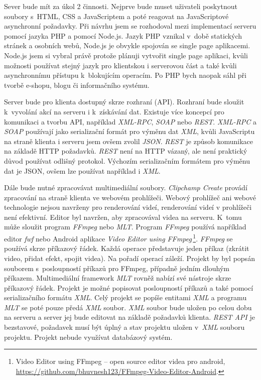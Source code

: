 Sever bude mít za úkol 2 činnosti. Nejprve bude muset uživateli poskytnout soubory s~HTML, CSS a JavaScriptem a poté reagovat na JavaScriptové asynchronní požadavky. Při návrhu jsem se rozhodoval mezi implementací serveru pomocí jazyka PHP a pomocí Node.js. Jazyk PHP vznikal v~době statických stránek a osobních webů, Node.js je obvykle spojován se single page aplikacemi. Node.js jsem si vybral právě protože plánuji vytvořit single page aplikaci, kvůli možnosti používat stejný jazyk pro klientskou i serverovou část a také kvůli asynchronnímu přístupu k~blokujícím operacím. Po PHP bych naopak sáhl při tvorbě e-shopu, blogu či informačního systému.

Server bude pro klienta dostupný skrze rozhraní (API). Rozhraní bude sloužit k~vyvolání akcí na serveru i k~získávání dat. Existuje více koncepcí pro komunikaci a tvorbu API, například \textit{XML-RPC}, \textit{SOAP} nebo \textit{REST}. \textit{XML-RPC} a \textit{SOAP} používají jako serializační formát pro výměnu dat \textit{XML}, kvůli JavaScriptu na straně klienta i serveru jsem ovšem zvolil \textit{JSON}. \textit{REST} je způsob komunikace na základě HTTP požadavků. \textit{REST} není na HTTP vázaný, ale není praktický důvod používat odlišný protokol. Výchozím serializačním formátem pro výměnu dat je JSON, ovšem lze používat například i \textit{XML}.

Dále bude nutné zpracovávat multimediální soubory. \textit{Clipchamp Create} provádí zpracování na straně klienta ve webovém prohlížeči. Webový prohlížeč ani webové technologie nejsou navrženy pro renderování videí, renderování videí v prohlížeči není efektivní. Editor byl navržen, aby zpracovával videa na serveru. K~tomu může sloužit program \textit{FFmpeg} nebo \textit{MLT}. Program \textit{FFmpeg} používá například editor \textit{fwf} nebo Android aplikace \textit{Video Editor using FFmpeg}\,\footnote{Video Editor using FFmpeg -- open source editor videa pro android, \url{https://github.com/bhuvnesh123/FFmpeg-Video-Editor-Android}.}. \textit{FFmpeg} se používá skrze příkazový řádek. Každá operace představuje jeden příkaz (zkrátit video, přidat efekt, spojit videa). Na pořadí operací záleží. Projekt by byl popsán souborem s~posloupností příkazů pro FFmpeg, případně jedním dlouhým příkazem. Multimediální framework \textit{MLT} rovněž nabízí své nástroje skrze příkazový řádek. Projekt je možné popisovat posloupností příkazů a také pomocí serializačního formátu \textit{XML}. Celý projekt se popíše entitami \textit{XML} a programu \textit{MLT} se poté pouze předá \textit{XML} soubor. \textit{XML} soubor bude uložen po celou dobu na serveru a server jej bude editovat na základě požadavků klienta. \textit{REST API} je bezstavové, požadavek musí být úplný a stav projektu uložen v~\textit{XML} souboru projektu. Projekt nebude využívat databázový systém.


